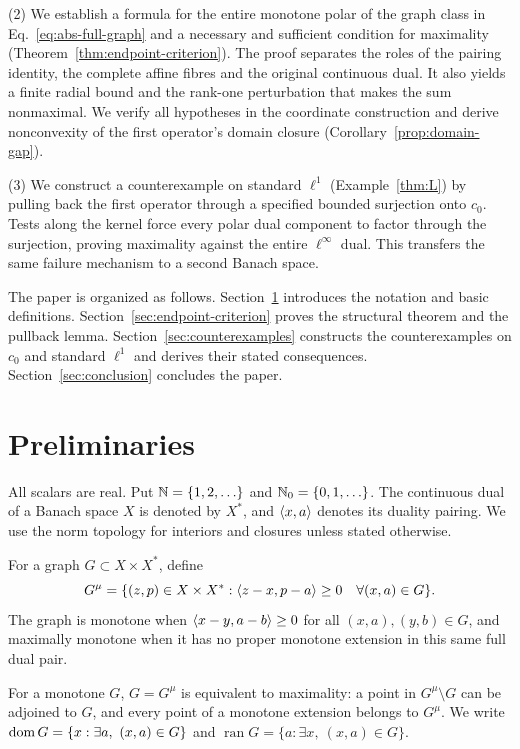 (2) We establish a formula for the entire monotone polar of the graph
class in Eq.~\eqref{eq:abs-full-graph} and a necessary and sufficient
condition for maximality (Theorem~\ref{thm:endpoint-criterion}). The proof
separates the roles of the pairing identity, the complete affine fibres
and the original continuous dual. It also yields a finite radial bound
and the rank-one perturbation that makes the sum nonmaximal. We verify
all hypotheses in the coordinate construction and derive nonconvexity
of the first operator's domain closure (Corollary~\ref{prop:domain-gap}).

(3) We construct a counterexample on standard $\ell^1$
(Example~\ref{thm:L}) by pulling back the first operator through a
specified bounded surjection onto $c_0$. Tests along the kernel force
every polar dual component to factor through the surjection, proving
maximality against the entire $\ell^\infty$ dual. This transfers the same
failure mechanism to a second Banach space.

The paper is organized as follows. Section~\ref{sec:definitions}
introduces the notation and basic definitions.
Section~\ref{sec:endpoint-criterion} proves the structural theorem and
the pullback lemma. Section~\ref{sec:counterexamples} constructs the
counterexamples on $c_0$ and standard $\ell^1$ and derives their stated
consequences. Section~\ref{sec:conclusion} concludes the paper.


\section{Preliminaries}
\label{sec:definitions}
All scalars are real. Put $\mathbb N=\{1,2,\ldots\}$ and $\mathbb N_0=\{0,1,\ldots\}$.
The continuous dual of a Banach space $X$ is denoted by $X^*$, and
$\langle x,a\rangle$ denotes its duality pairing. We use the norm topology for
interiors and closures unless stated otherwise.

\begin{definition}
For a graph $G\subset X\times X^*$, define
\begin{equation}
G^\mu=\{(z,p)\in X\times X^*:
 \langle z-x,p-a\rangle\ge0\quad\forall(x,a)\in G\}.
\label{eq:D1}
\end{equation}
The graph is monotone when $\langle x-y,a-b\rangle\ge0$ for all
$(x,a),(y,b)\in G$,
and maximally monotone when it has no proper monotone extension in this same
full dual pair.
\end{definition}

For a monotone $G$, $G=G^\mu$ is equivalent to maximality: a point in
$G^\mu\setminus G$ can be adjoined to $G$, and every point of a monotone
extension belongs to $G^\mu$. We write
$\operatorname{dom} G=\{x:\exists a,\ (x,a)\in G\}$ and
$\operatorname{ran}G=\{a:\exists x,\ (x,a)\in G\}$.


